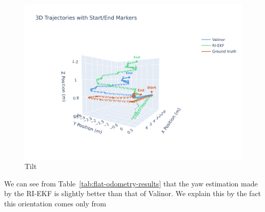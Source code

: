\documentclass{IJCAS}
\begin{document}
\begin{figure}[!t]
\begin{center}
\includegraphics[width=\columnwidth]{Uploaded/Images/3d_traj.pdf} 
\vskip -0.5pc
\caption{Tilt}\label{fig:3d_traj}
\end{center}
\vskip -1.5pc
\end{figure}

We can see from Table~\ref{tab:flat-odometry-results} that the yaw estimation made by the RI-EKF is slightly better than that of Valinor. We explain this by the fact this orientation comes only from 
\end{document}
